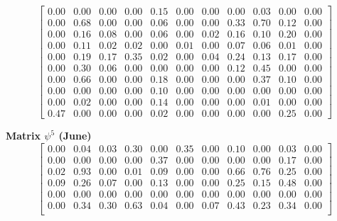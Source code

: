 \documentclass[a4paper,fleqn]{cas-dc}
\begin{document}
\begin{scriptsize}
\[\begin{bmatrix}
0.00 & 0.00 & 0.00 & 0.00 & 0.15 & 0.00 & 0.00 & 0.00 & 0.03 & 0.00 & 0.00\\

0.00 & 0.68 & 0.00 & 0.00 & 0.06 & 0.00 & 0.00 & 0.33 & 0.70 & 0.12 & 0.00\\

0.00 & 0.16 & 0.08 & 0.00 & 0.06 & 0.00 & 0.02 & 0.16 & 0.10 & 0.20 & 0.00\\

0.00 & 0.11 & 0.02 & 0.02 & 0.00 & 0.01 & 0.00 & 0.07 & 0.06 & 0.01 & 0.00\\

0.00 & 0.19 & 0.17 & 0.35 & 0.02 & 0.00 & 0.04 & 0.24 & 0.13 & 0.17 & 0.00\\

0.00 & 0.30 & 0.06 & 0.00 & 0.00 & 0.00 & 0.00 & 0.12 & 0.45 & 0.00 & 0.00\\

0.00 & 0.66 & 0.00 & 0.00 & 0.18 & 0.00 & 0.00 & 0.00 & 0.37 & 0.10 & 0.00\\

0.00 & 0.00 & 0.00 & 0.00 & 0.10 & 0.00 & 0.00 & 0.00 & 0.00 & 0.00 & 0.00\\

0.00 & 0.02 & 0.00 & 0.00 & 0.14 & 0.00 & 0.00 & 0.00 & 0.01 & 0.00 & 0.00\\

0.47 & 0.00 & 0.00 & 0.00 & 0.02 & 0.00 & 0.00 & 0.00 & 0.00 & 0.25 & 0.00

\end{bmatrix}
\]

\textbf{Matrix $\psi^{5}$ (June)}
\[
\begin{bmatrix}

0.00 & 0.04 & 0.03 & 0.30 & 0.00 & 0.35 & 0.00 & 0.10 & 0.00 & 0.03 & 0.00\\

0.00 & 0.00 & 0.00 & 0.00 & 0.37 & 0.00 & 0.00 & 0.00 & 0.00 & 0.17 & 0.00\\

0.02 & 0.93 & 0.00 & 0.01 & 0.09 & 0.00 & 0.00 & 0.66 & 0.76 & 0.25 & 0.00\\

0.09 & 0.26 & 0.07 & 0.00 & 0.13 & 0.00 & 0.00 & 0.25 & 0.15 & 0.48 & 0.00\\

0.00 & 0.00 & 0.00 & 0.00 & 0.00 & 0.00 & 0.00 & 0.00 & 0.00 & 0.00 & 0.00\\

0.00 & 0.34 & 0.30 & 0.63 & 0.04 & 0.00 & 0.07 & 0.43 & 0.23 & 0.34 & 0.00\\


\end{bmatrix}\]
\end{scriptsize}
\end{document}
